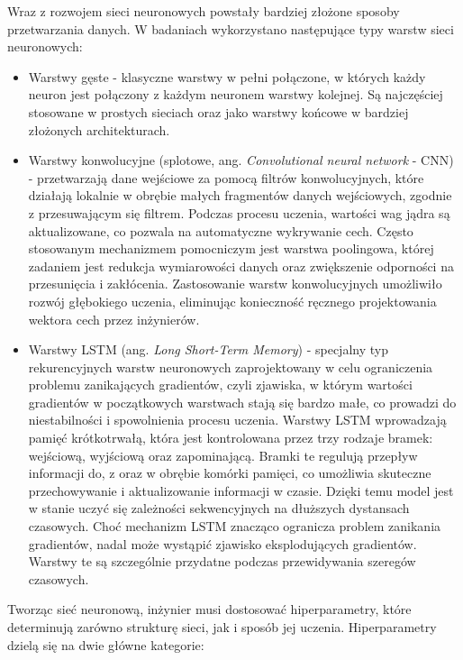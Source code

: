 \documentclass[a4paper,twoside,12pt]{book}
\newcommand{\obcy}[1]{\emph{#1}}
\newcommand{\english}[1]{{\selectlanguage{british}\obcy{#1}}}
\begin{document}
Wraz z rozwojem sieci neuronowych powstały bardziej złożone sposoby przetwarzania danych. W badaniach wykorzystano następujące typy warstw sieci neuronowych:
\begin{itemize}
	\item Warstwy gęste - klasyczne warstwy w pełni połączone, w których każdy neuron jest połączony z każdym neuronem warstwy kolejnej. Są najczęściej stosowane w prostych sieciach oraz jako warstwy końcowe w bardziej złożonych architekturach.

	\item Warstwy konwolucyjne (splotowe, ang. \english{Convolutional neural network} - CNN) - przetwarzają dane wejściowe za pomocą filtrów konwolucyjnych, które działają lokalnie w obrębie małych fragmentów danych wejściowych, zgodnie z przesuwającym się filtrem. Podczas procesu uczenia, wartości wag jądra są aktualizowane, co pozwala na automatyczne wykrywanie cech. Często stosowanym mechanizmem pomocniczym jest warstwa poolingowa, której zadaniem jest redukcja wymiarowości danych oraz zwiększenie odporności na przesunięcia i zakłócenia.
	      Zastosowanie warstw konwolucyjnych umożliwiło rozwój głębokiego uczenia, eliminując konieczność ręcznego projektowania wektora cech przez inżynierów.

	\item Warstwy LSTM (ang. \english{Long Short-Term Memory}) - specjalny typ rekurencyjnych warstw neuronowych zaprojektowany w celu ograniczenia problemu zanikających gradientów, czyli zjawiska, w którym wartości gradientów w początkowych warstwach stają się bardzo małe, co prowadzi do niestabilności i spowolnienia procesu uczenia. Warstwy LSTM wprowadzają pamięć krótkotrwałą, która jest kontrolowana przez trzy rodzaje bramek: wejściową, wyjściową oraz zapominającą. Bramki te regulują przepływ informacji do, z oraz w obrębie komórki pamięci, co umożliwia skuteczne przechowywanie i aktualizowanie informacji w czasie. Dzięki temu model jest w stanie uczyć się zależności sekwencyjnych na dłuższych dystansach czasowych. Choć mechanizm LSTM znacząco ogranicza problem zanikania gradientów, nadal może wystąpić zjawisko eksplodujących gradientów. Warstwy te są szczególnie przydatne podczas przewidywania szeregów czasowych.
\end{itemize}
Tworząc sieć neuronową, inżynier musi dostosować hiperparametry, które determinują zarówno strukturę sieci, jak i sposób jej uczenia. Hiperparametry dzielą się na dwie główne kategorie:
\end{document}

